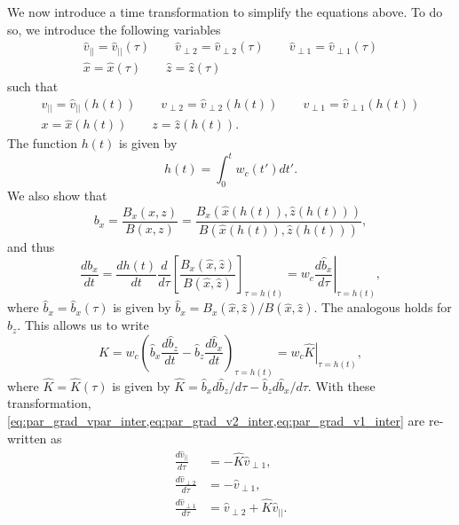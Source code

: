 \documentclass[oneside,a4paper,11pt]{report}
\begin{document}
We now introduce a time transformation to simplify the equations above. To do so, we introduce the following variables
\begin{gather}
    \hat{v}_{||} = \hat{v}_{||}(\tau) \qquad \hat{v}_{\perp2} = \hat{v}_{\perp2}(\tau) \qquad \hat{v}_{\perp1} = \hat{v}_{\perp1}(\tau) \\
    \hat{x} = \hat{x}(\tau) \qquad \hat{z} = \hat{z}(\tau)
\end{gather}
such that
\begin{gather}
    v_{||} = \hat{v}_{||}(h(t)) \qquad v_{\perp2} = \hat{v}_{\perp2}(h(t)) \qquad v_{\perp1} = \hat{v}_{\perp1}(h(t)) \\
    x = \hat{x}(h(t)) \qquad z = \hat{z}(h(t)).
\end{gather}
The function $h(t)$ is given by
\begin{equation}
    h(t) = \int_0^t w_c(t') dt'.
\end{equation}
We also show that
\begin{equation}
    b_x = \frac{B_x(x,z)}{B(x,z)} = \frac{B_x(\hat{x}(h(t)),\hat{z}(h(t)))}{B(\hat{x}(h(t)),\hat{z}(h(t)))},
\end{equation}
and thus
\begin{equation}
    \frac{db_x}{dt} = \frac{dh(t)}{dt} \frac{d}{d\tau} \left [ \frac{B_x(\hat{x},\hat{z})}{B(\hat{x},\hat{z})} \right ]_{\tau = h(t)} = w_c \left .\frac{d \hat{b}_x}{d\tau} \right|_{\tau = h(t)},
\end{equation}
where $\hat{b}_x =\hat{b}_x(\tau)$ is given by $\hat{b}_x= B_x(\hat{x},\hat{z}) / B(\hat{x},\hat{z})$. The analogous holds for $b_z$. This allows us to write
\begin{equation}
    K = w_c \left ( \hat{b}_x \frac{d\hat{b}_z}{dt} - \hat{b}_z \frac{d\hat{b}_x}{dt} \right)_{\tau = h(t)} = w_c \left. \hat{K} \right |_{\tau = h(t)},
\end{equation}
where $\hat{K} = \hat{K}(\tau)$ is given by $\hat{K} = \hat{b}_x d\hat{b}_z/d\tau - \hat{b}_z d\hat{b}_x/d\tau$. With these transformation, \cref{eq:par_grad_vpar_inter,eq:par_grad_v2_inter,eq:par_grad_v1_inter} are re-written as
\begin{align}
    \frac{d\hat{v}_{||}}{d\tau} &= -\hat{K} \hat{v}_{\perp1},\\
    \frac{d\hat{v}_{\perp2}}{d\tau} &= -\hat{v}_{\perp1},\\
    \frac{d\hat{v}_{\perp1}}{d\tau} &= \hat{v}_{\perp2} + \hat{K} \hat{v}_{||}.
\end{align}
\end{document}
